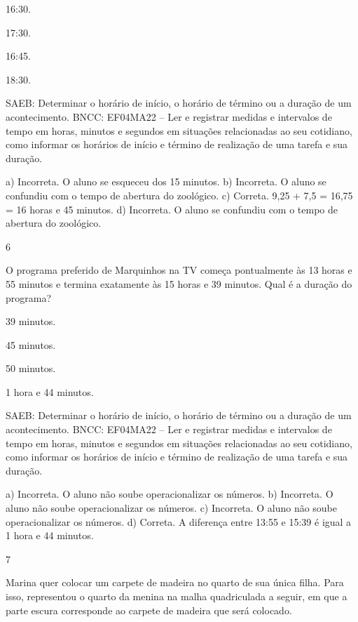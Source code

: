 \begin{mdframed}[linewidth=2pt,linecolor=salmao,roundcorner=2pt]
\begin{escolha}
{\begin{escolha}
\begin{escolha}
\item
  16:30.
\item
  17:30.
\item
  16:45.
\item
  18:30.
\end{escolha}

SAEB: Determinar o horário de início, o horário de término ou
a duração de um acontecimento.
BNCC: EF04MA22 -- Ler e registrar medidas e intervalos de tempo em horas, minutos e segundos em
situações relacionadas ao seu cotidiano, como informar os horários de início e término de realização
de uma tarefa e sua duração.

a) Incorreta. O aluno se esqueceu dos 15 minutos.
b) Incorreta. O aluno se confundiu com o tempo de abertura do zoológico.
c) Correta. 9,25 + 7,5 = 16,75 = 16 horas e 45 minutos.
d) Incorreta. O aluno se confundiu com o tempo de abertura do zoológico.

\num{6}

O programa preferido de Marquinhos na TV começa pontualmente às 13
horas e 55 minutos e termina exatamente às 15 horas e 39 minutos. Qual é a
duração do programa?

\begin{escolha}
\item
  39 minutos.
\item
  45 minutos.
\item
  50 minutos.
\item
  1 hora e 44 minutos.
\end{escolha}

SAEB: Determinar o horário de início, o horário de término ou
a duração de um acontecimento.
BNCC: EF04MA22 -- Ler e registrar medidas e intervalos de tempo em horas, minutos e segundos em
situações relacionadas ao seu cotidiano, como informar os horários de início e término de realização
de uma tarefa e sua duração.

a) Incorreta. O aluno não soube operacionalizar os números.
b) Incorreta. O aluno não soube operacionalizar os números.
c) Incorreta. O aluno não soube operacionalizar os números.
d) Correta. A diferença entre 13:55 e 15:39 é igual a 1 hora e 44 minutos.

\num{7}

Marina quer colocar um carpete de madeira no quarto de sua única filha.
Para isso, representou o quarto da menina na malha quadriculada a seguir, em que a parte escura corresponde ao carpete de madeira que será
colocado.


\end{escolha}}
\end{escolha}
\end{mdframed}
